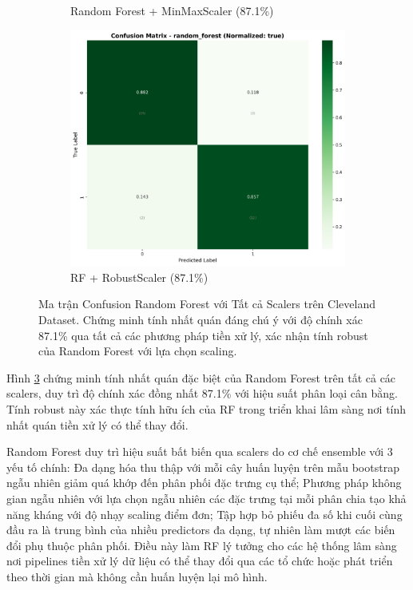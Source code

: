 \begin{figure}[H]
\begin{subfigure}[b]{0.315\textwidth}
\caption{Random Forest + MinMaxScaler (87.1\%)}
\label{fig:rf_minmaxscaler_complete}
\end{subfigure}
\hfill
\begin{subfigure}[b]{0.315\textwidth}
\centering
\includegraphics[width=1\textwidth]{Result/cleveland_dataset/confusion_matrices/random_forest_numeric_dataset_RobustScaler.png}
\caption{RF + RobustScaler (87.1\%)}
\label{fig:rf_robustscaler}
\end{subfigure}

\caption{Ma trận Confusion Random Forest với Tất cả Scalers trên Cleveland Dataset. Chứng minh tính nhất quán đáng chú ý với độ chính xác 87.1\% qua tất cả các phương pháp tiền xử lý, xác nhận tính robust của Random Forest với lựa chọn scaling.}
\label{fig:rf_all_scalers_complete}
\end{figure}

Hình \ref{fig:rf_all_scalers_complete} chứng minh tính nhất quán đặc biệt của Random Forest trên tất cả các scalers, duy trì độ chính xác đồng nhất 87.1\% với hiệu suất phân loại cân bằng. Tính robust này xác thực tính hữu ích của RF trong triển khai lâm sàng nơi tính nhất quán tiền xử lý có thể thay đổi.

Random Forest duy trì hiệu suất bất biến qua scalers do cơ chế ensemble với 3 yếu tố chính: Đa dạng hóa thu thập với mỗi cây huấn luyện trên mẫu bootstrap ngẫu nhiên giảm quá khớp đến phân phối đặc trưng cụ thể; Phương pháp không gian ngẫu nhiên với lựa chọn ngẫu nhiên các đặc trưng tại mỗi phân chia tạo khả năng kháng với độ nhạy scaling điểm đơn; Tập hợp bỏ phiếu đa số khi cuối cùng đầu ra là trung bình của nhiều predictors đa dạng, tự nhiên làm mượt các biến đổi phụ thuộc phân phối. Điều này làm RF lý tưởng cho các hệ thống lâm sàng nơi pipelines tiền xử lý dữ liệu có thể thay đổi qua các tổ chức hoặc phát triển theo thời gian mà không cần huấn luyện lại mô hình.

